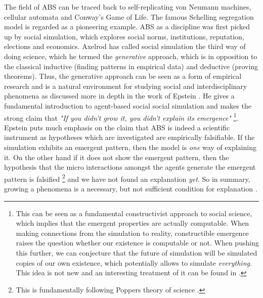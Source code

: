 The field of ABS can be traced back to self-replicating von Neumann machines, cellular automata and Conway's Game of Life. The famous Schelling segregation model \cite{schelling_dynamic_1971} is regarded as a pioneering example. ABS as a discipline was first picked up by social simulation, which explores social norms, institutions, reputation, elections and economics. Axelrod \cite{axelrod_advancing_1997, axelrod_guide_2006} has called social simulation the third way of doing science, which he termed the \textit{generative} approach, which is in opposition to the classical inductive (finding patterns in empirical data) and deductive (proving theorems). Thus, the generative approach can be seen as a form of empirical research and is a natural environment for studying social and interdisciplinary phenomena as discussed more in depth in the work of Epstein \cite{epstein_chapter_2006, epstein_generative_2012}. He gives a fundamental introduction to agent-based social social simulation and makes the strong claim that \textit{"If you didn't grow it, you didn't explain its emergence"} \footnote{This can be seen as a fundamental constructivist approach to social science, which implies that the emergent properties are actually computable. When making connections from the simulation to reality, constructible emergence raises the question whether our existence is computable or not. When pushing this further, we can conjecture that the future of simulation will be simulated copies of our own existence, which potentially allows to simulate \textit{everything}. This idea is not new and an interesting treatment of it can be found in \cite{bostrom_are_2003, steinhart_theological_2010}.}. 
Epstein puts much emphasis on the claim that ABS is indeed a scientific instrument as hypotheses which are investigated are empirically falsifiable. If the simulation exhibits an emergent pattern, then the model is \textit{one} way of explaining it. On the other hand if it does not show the emergent pattern, then the hypothesis that the micro interactions amongst the agents generate the emergent pattern is falsified \footnote{This is fundamentally following Poppers theory of science \cite{popper_logic_2002}.} and we have not found an explanation \textit{yet}. So in summary, growing a phenomena is a necessary, but not sufficient condition for explanation \cite{epstein_chapter_2006}.


